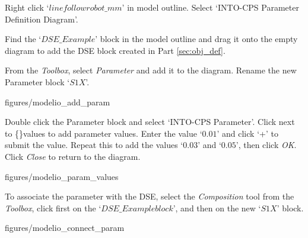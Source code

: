 \documentclass[11pt,a4paper]{../tutorial}
\begin{document}
\begin{instructions}

\item Right click `$linefollowrobot\_mm$' in model outline. Select `INTO-CPS \menusep Parameter Definition Diagram'.

\item Find the `$DSE\_Example$' block in the model outline and drag it onto the empty diagram to add the DSE block created in Part \ref{sec:obj_def}.

\item \label{start_par_def} From the \emph{Toolbox}, select \emph{Parameter} and add it to the diagram. Rename the new Parameter block `$S1X$'.

\begin{center}
\begin{annotation}[width=0.7\linewidth]{figures/modelio_add_param}
    \end{annotation}
\end{center}

\newpage

\item Double click the Parameter block and select `INTO-CPS \menusep Parameter'. Click next to \{\}values to add parameter values. Enter the value `$0.01$' and click `+' to submit the value. Repeat this to add the values `$0.03$' and `$0.05$', then click \emph{OK}. Click \emph{Close} to return to the diagram.

\begin{center}
\begin{annotation}[width=0.7\linewidth]{figures/modelio_param_values}
    \end{annotation}
\end{center}

\item \label{end_par_def} To associate the parameter with the DSE, select the \emph{Composition} tool from the \emph{Toolbox}, click first on the `$DSE\_Example block$', and then on the new `$S1X$' block.

\begin{center}
\begin{annotation}[width=0.7\linewidth]{figures/modelio_connect_param}
    \end{annotation}
\end{center}


\end{instructions}
\end{document}
